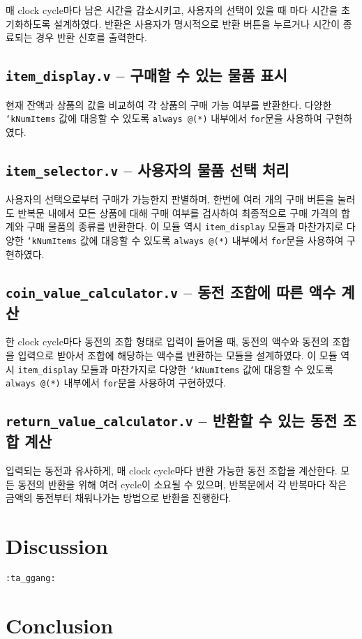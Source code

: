 \documentclass{scrartcl}
\begin{document}
매 clock cycle마다 남은 시간을 감소시키고, 사용자의 선택이 있을 때 마다 시간을 초기화하도록 설계하였다.
반환은 사용자가 명시적으로 반환 버튼을 누르거나 시간이 종료되는 경우 반환 신호를 출력한다.

\subsection{\texttt{item\_display.v} -- 구매할 수 있는 물품 표시}

현재 잔액과 상품의 값을 비교하여 각 상품의 구매 가능 여부를 반환한다. 다양한 \texttt{`kNumItems} 값에 대응할 수 있도록
\texttt{always @(*)} 내부에서 \texttt{for}문을 사용하여 구현하였다.

\subsection{\texttt{item\_selector.v} -- 사용자의 물품 선택 처리}

사용자의 선택으로부터 구매가 가능한지 판별하며, 한번에 여러 개의 구매 버튼을 눌러도 반복문 내에서
모든 상품에 대해 구매 여부를 검사하여 최종적으로 구매 가격의 합계와 구매 물품의 종류를 반환한다. 이 모듈 역시
\texttt{item\_display} 모듈과 마찬가지로 다양한 \texttt{`kNumItems} 값에 대응할 수 있도록
\texttt{always @(*)} 내부에서 \texttt{for}문을 사용하여 구현하였다.

\subsection{\texttt{coin\_value\_calculator.v} -- 동전 조합에 따른 액수 계산}
한 clock cycle마다 동전의 조합 형태로 입력이 들어올 때, 동전의 액수와 동전의 조합을 입력으로 받아서
조합에 해당하는 액수를 반환하는 모듈을 설계하였다. 이 모듈 역시 \texttt{item\_display} 모듈과 마찬가지로 다양한
\texttt{`kNumItems} 값에 대응할 수 있도록 \texttt{always @(*)} 내부에서 \texttt{for}문을 사용하여
구현하였다.

\subsection{\texttt{return\_value\_calculator.v} -- 반환할 수 있는 동전 조합 계산}

입력되는 동전과 유사하게, 매 clock cycle마다 반환 가능한 동전 조합을 계산한다.
모든 동전의 반환을 위해 여러 cycle이 소요될 수 있으며, 반복문에서 각 반복마다 작은 금액의 동전부터 채워나가는 방법으로 반환을
진행한다.

\section{Discussion}
\texttt{:ta\_ggang:} %

\section{Conclusion}
\end{document}
